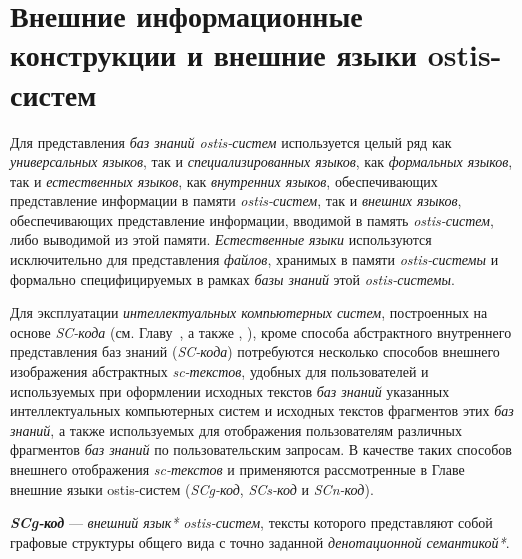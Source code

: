 \section{Внешние информационные конструкции и внешние языки ostis-систем}
\label{sec_external_information_constructs_external_lang}

Для представления \textit{баз знаний ostis-систем} используется целый ряд как \textit{универсальных языков}, так и \textit{специализированных языков}, как \textit{формальных языков}, так и \textit{естественных языков}, как \textit{внутренних языков}, обеспечивающих представление информации в памяти \textit{ostis-систем}, так и \textit{внешних языков}, обеспечивающих представление информации, вводимой в память \textit{ostis-систем}, либо выводимой из этой памяти. \textit{Естественные языки} используются исключительно для представления \textit{файлов}, хранимых в памяти \textit{ostis-системы} и формально специфицируемых в рамках \textit{базы знаний} этой \textit{ostis-системы}.

Для эксплуатации \textit{интеллектуальных компьютерных систем}, построенных на основе \textit{SC-кода} (см. Главу~, а также , ), кроме способа абстрактного внутреннего представления баз знаний (\textit{SC-кода}) потребуются несколько способов внешнего изображения абстрактных \textit{sc-текстов}, удобных для пользователей и используемых при оформлении исходных текстов \textit{баз знаний} указанных интеллектуальных компьютерных систем и исходных текстов фрагментов этих \textit{баз знаний}, а также используемых для отображения пользователям различных фрагментов \textit{баз знаний} по пользовательским запросам.
В качестве таких способов внешнего отображения \textit{sc-текстов} и применяются рассмотренные в Главе~ внешние языки ostis-систем (\textit{SCg-код}, \textit{SCs-код} и \textit{SCn-код}).

\textbf{\textit{SCg-код}} --- \textit{внешний язык*} \textit{ostis-систем}, тексты которого представляют собой графовые структуры общего вида с точно заданной \textit{денотационной семантикой*}.

\begin{SCn}

    \begin{scnindent}
    \end{scnindent}

\end{SCn}

